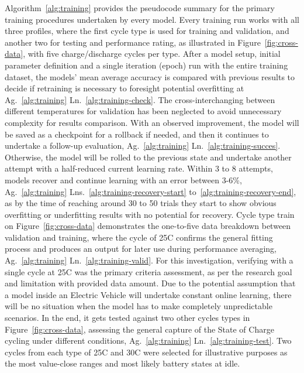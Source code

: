 %
Algorithm~\ref{alg:training} provides the pseudocode summary for the primary training procedures undertaken by every model.
Every training run works with all three profiles, where the first cycle type is used for training and validation, and another two for testing and performance rating, as illustrated in Figure~\ref{fig:cross-data}, with five charge/discharge cycles per type.
After a model setup, initial parameter definition and a single iteration (epoch) run with the entire training dataset, the models' mean average accuracy is compared with previous results to decide if retraining is necessary to foresight potential overfitting at Ag.~\ref{alg:training} Ln.~\ref{alg:training-check}.
The cross-interchanging between different temperatures for validation has been neglected to avoid unnecessary complexity for results comparison.
With an observed improvement, the model will be saved as a checkpoint for a rollback if needed, and then it continues to undertake a follow-up evaluation, Ag.~\ref{alg:training} Ln.~\ref{alg:training-succes}.
Otherwise, the model will be rolled to the previous state and undertake another attempt with a half-reduced current learning rate.
Within 3 to 8 attempts, models recover and continue learning with an error between 3-6\%, Ag.~\ref{alg:training} Lns.~\ref{alg:training-recovery-start} to~\ref{alg:training-recovery-end}, as by the time of reaching around 30 to 50 trials they start to show obvious overfitting or underfitting results with no potential for recovery.
Cycle type train on Figure~\ref{fig:cross-data} demonstrates the one-to-five data breakdown between validation and training, where the cycle of 25\textdegree{}C confirms the general fitting process and produces an output for later use during performance averaging, Ag.~\ref{alg:training} Ln.~\ref{alg:training-valid}.
For this investigation, verifying with a single cycle at 25\textdegree{}C was the primary criteria assessment, as per the research goal and limitation with provided data amount.
Due to the potential assumption that a model inside an Electric Vehicle will undertake constant online learning, there will be no situation when the model has to make completely unpredictable scenarios.
In the end, it gets tested against two other cycles types in Figure~\ref{fig:cross-data}, assessing the general capture of the State of Charge cycling under different conditions, Ag.~\ref{alg:training} Ln.~\ref{alg:training-test}.
Two cycles from each type of 25\textdegree{}C and 30\textdegree{}C were selected for illustrative purposes as the most value-close ranges and most likely battery states at idle.
